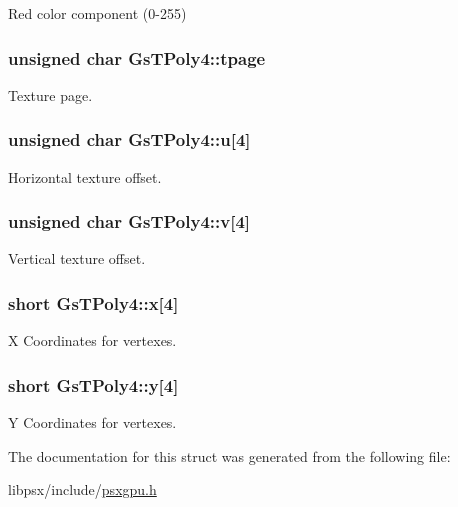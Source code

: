 Red color component (0-\/255) 

\hypertarget{structGsTPoly4_a1a79cc052f1e999badbd984ea7860b54}{}
\subsubsection[{tpage}]{\setlength{\rightskip}{0pt plus 5cm}unsigned char Gs\+T\+Poly4\+::tpage}\label{structGsTPoly4_a1a79cc052f1e999badbd984ea7860b54}


Texture page. 

\hypertarget{structGsTPoly4_a92294b5e2be9cab5b87149fa8840ce77}{}
\subsubsection[{u}]{\setlength{\rightskip}{0pt plus 5cm}unsigned char Gs\+T\+Poly4\+::u\mbox{[}4\mbox{]}}\label{structGsTPoly4_a92294b5e2be9cab5b87149fa8840ce77}


Horizontal texture offset. 

\hypertarget{structGsTPoly4_a76767d49028942c4e3d7aa0d54b60ee7}{}
\subsubsection[{v}]{\setlength{\rightskip}{0pt plus 5cm}unsigned char Gs\+T\+Poly4\+::v\mbox{[}4\mbox{]}}\label{structGsTPoly4_a76767d49028942c4e3d7aa0d54b60ee7}


Vertical texture offset. 

\hypertarget{structGsTPoly4_a6348d047a5123bf2c7b6d70d96d216ae}{}
\subsubsection[{x}]{\setlength{\rightskip}{0pt plus 5cm}short Gs\+T\+Poly4\+::x\mbox{[}4\mbox{]}}\label{structGsTPoly4_a6348d047a5123bf2c7b6d70d96d216ae}


X Coordinates for vertexes. 

\hypertarget{structGsTPoly4_a0a64e0d7ce40b4a5690b5af814c4fd7d}{}
\subsubsection[{y}]{\setlength{\rightskip}{0pt plus 5cm}short Gs\+T\+Poly4\+::y\mbox{[}4\mbox{]}}\label{structGsTPoly4_a0a64e0d7ce40b4a5690b5af814c4fd7d}


Y Coordinates for vertexes. 



The documentation for this struct was generated from the following file\+:\begin{DoxyCompactItemize}
\item 
libpsx/include/\hyperlink{psxgpu_8h}{psxgpu.\+h}\end{DoxyCompactItemize}
